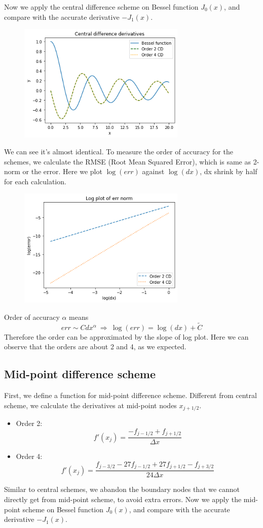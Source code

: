 \documentclass{article}
\begin{document}
Now we apply the central difference scheme on Bessel function $J_0(x)$, and compare with the accurate derivative $-J_1(x)$.

\begin{figure}[H]
    \centering
    \includegraphics[width = 8cm]{pictures/pic2.png}
\end{figure}

We can see it's almost identical. To measure the order of accuracy for the schemes, we calculate the RMSE (Root Mean Squared Error), which is same as 2-norm or the error. Here we plot $\log(err)$ against $\log(dx)$, dx shrink by half for each calculation.

\begin{figure}[H]
    \centering
    \includegraphics[width = 8cm]{pictures/pic3.png}
\end{figure}

Order of accuracy $\alpha$ means 
$$err\sim Cdx^\alpha\ \Rightarrow\  \log(err)=\log(dx)+\tilde{C}$$ 
Therefore the order can be approximated by the slope of log plot. Here we can observe that the orders are about 2 and 4, as we expected.

\subsection{Mid-point difference scheme}
First, we define a function for mid-point difference scheme. Different from central scheme, we calculate the derivatives at mid-point nodes $x_{j+1/2}$.
\begin{itemize}
    \item Order 2:
    $$f'(x_j)=\frac{-f_{j-1/2} + f_{j+1/2}}{\Delta x}$$
    \item Order 4:
    $$f'(x_j)=\frac{f_{j-3/2} - 27f_{j-1/2} + 27f_{j+1/2} - f_{j+3/2}}{24\Delta x}$$
\end{itemize}
Similar to central schemes, we abandon the boundary nodes that we cannot directly get from mid-point scheme, to avoid extra errors. Now we apply the mid-point scheme on Bessel function $J_0(x)$, and compare with the accurate derivative $-J_1(x)$.
\end{document}
